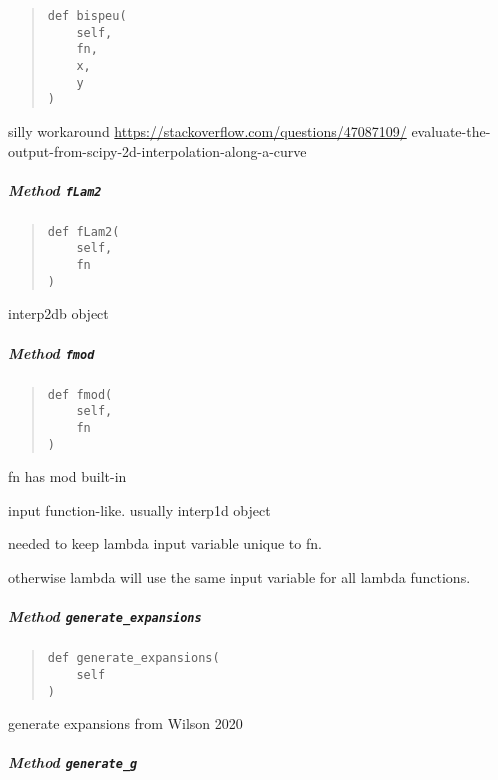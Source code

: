 \documentclass[english,a4paper,oneside]{article}
\let\oldsubparagraph\subparagraph
\renewcommand{\subparagraph}[1]{\oldsubparagraph{#1}\mbox{}}
\begin{document}
\begin{quote}
\begin{verbatim}
def bispeu(
    self,
    fn,
    x,
    y
)
\end{verbatim}
\end{quote}

silly workaround \url{https://stackoverflow.com/questions/47087109/}
evaluate-the-output-from-scipy-2d-interpolation-along-a-curve

\hypertarget{StrongCoupling.StrongCoupling.fLam2}{%
\subparagraph{\texorpdfstring{Method
\texttt{fLam2}}{Method fLam2}}\label{StrongCoupling.StrongCoupling.fLam2}}

\begin{quote}
\begin{verbatim}
def fLam2(
    self,
    fn
)
\end{verbatim}
\end{quote}

interp2db object

\hypertarget{StrongCoupling.StrongCoupling.fmod}{%
\subparagraph{\texorpdfstring{Method
\texttt{fmod}}{Method fmod}}\label{StrongCoupling.StrongCoupling.fmod}}

\begin{quote}
\begin{verbatim}
def fmod(
    self,
    fn
)
\end{verbatim}
\end{quote}

fn has mod built-in

input function-like. usually interp1d object

needed to keep lambda input variable unique to fn.

otherwise lambda will use the same input variable for all lambda
functions.

\hypertarget{StrongCoupling.StrongCoupling.generate_expansions}{%
\subparagraph{\texorpdfstring{Method
\texttt{generate\_expansions}}{Method generate\_expansions}}\label{StrongCoupling.StrongCoupling.generate_expansions}}

\begin{quote}
\begin{verbatim}
def generate_expansions(
    self
)
\end{verbatim}
\end{quote}

generate expansions from Wilson 2020

\hypertarget{StrongCoupling.StrongCoupling.generate_g}{%
\subparagraph{\texorpdfstring{Method
\texttt{generate\_g}}{Method generate\_g}}\label{StrongCoupling.StrongCoupling.generate_g}}
\end{document}
